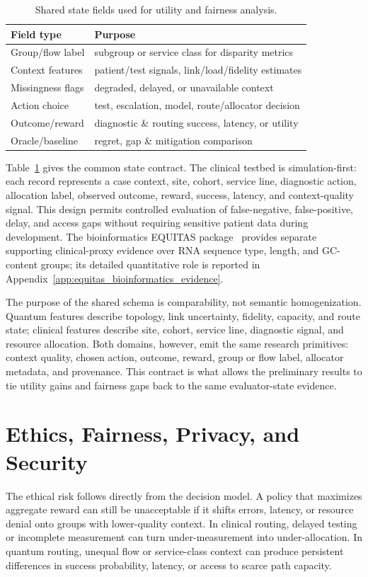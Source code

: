 \documentclass[conference]{IEEEtran}
\begin{document}
\begin{table}[t]
\caption{Shared state fields used for utility and fairness analysis.}
\label{tab:data_fields}
\centering
\small
\begin{tabular}{p{}p{}}
\toprule
\textbf{Field type} & \textbf{Purpose} \\
\midrule
Group/flow label & subgroup or service class for disparity metrics \\
Context features & patient/test signals, link/load/fidelity estimates \\
Missingness flags & degraded, delayed, or unavailable context \\
Action choice & test, escalation, model, route/allocator decision \\
Outcome/reward & diagnostic \& routing success, latency, or utility \\
Oracle/baseline & regret, gap \& mitigation comparison \\
\bottomrule
\end{tabular}
\end{table}

Table~\ref{tab:data_fields} gives the common state contract. The clinical
testbed is simulation-first: each record represents a case context, site,
cohort, service line, diagnostic action, allocation label, observed outcome,
reward, success, latency, and context-quality signal. This design permits
controlled evaluation of false-negative, false-positive, delay, and access
gaps without requiring sensitive patient data during development. The
bioinformatics EQUITAS package~\cite{garcia2025equitable_bioinformatics}
provides separate supporting clinical-proxy evidence over RNA sequence type,
length, and GC-content groups; its detailed quantitative role is reported in
Appendix~\ref{app:equitas_bioinformatics_evidence}.

The purpose of the shared schema is comparability, not semantic
homogenization. Quantum features describe topology, link uncertainty,
fidelity, capacity, and route state; clinical features describe site, cohort,
service line, diagnostic signal, and resource allocation. Both domains,
however, emit the same research primitives: context quality, chosen action,
outcome, reward, group or flow label, allocator metadata, and provenance. This
contract is what allows the preliminary results to tie utility gains and
fairness gaps back to the same evaluator-state evidence.

\section{Ethics, Fairness, Privacy, and Security}
The ethical risk follows directly from the decision model. A policy that
maximizes aggregate reward can still be unacceptable if it shifts errors,
latency, or resource denial onto groups with lower-quality context. In
clinical routing, delayed testing or incomplete measurement can turn
under-measurement into under-allocation. In quantum routing, unequal flow or
service-class context can produce persistent differences in success
probability, latency, or access to scarce path capacity.
\end{document}
